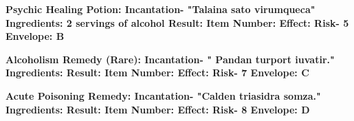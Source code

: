 \documentclass[green]{Kos}
\begin{document}
\bf{Psychic Healing Potion:}
Incantation- "Talaina sato virumqueca"
Ingredients: 2 servings of alcohol
Result: \iPsychicHealthRemedy{\MYname}
Item Number: \iPsychicHealthRemedy{\MYnumber}
Effect: \iPsychicHealthRemedy{\MYtext}
Risk- 5
Envelope: B

\bf{Alcoholism Remedy (Rare):}
Incantation- " Pandan turport iuvatir."
Ingredients: \iSugar{\MYname}
Result: \iAlcoholismRemedy{\MYname}
Item Number: \iAlcoholismRemedy{\MYnumber}
Effect: \iAlcoholismRemedy{\MYtext}
Risk- 7
Envelope: C

\bf{Acute Poisoning Remedy:}
Incantation- "Calden triasidra somza."
Ingredients: \iHerbs{\MYname}
Result: \iAcutePoisonRemedy{\MYname}
Item Number: \iAcutePoisonRemedy{\MYnumber}
Effect: \iAcutePoisonRemedy{\MYtext}
Risk- 8
Envelope: D
\end{document}
